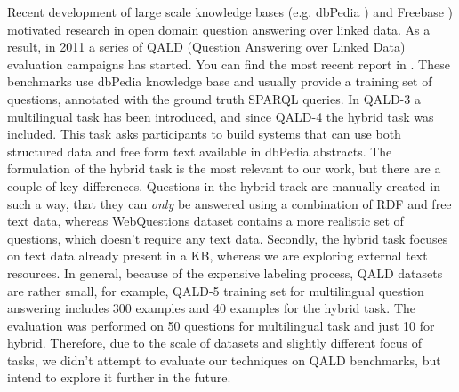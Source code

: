 
Recent development of large scale knowledge bases (e.g. dbPedia \cite{auer2007dbpedia}) and Freebase \cite{Bollacker:2008:FCC:1376616.1376746}) motivated research in open domain question answering over linked data.
As a result, in 2011 a series of QALD (Question Answering over Linked Data) evaluation campaigns has started.
You can find the most recent report in \cite{UngerFLNCCW15}.
These benchmarks use dbPedia knowledge base and usually provide a training set of questions, annotated with the ground truth SPARQL queries.
In QALD-3 a multilingual task has been introduced, and since QALD-4 the hybrid task was included.
This task asks participants to build systems that can use both structured data and free form text available in dbPedia abstracts.
The formulation of the hybrid task is the most relevant to our work, but there are a couple of key differences.
Questions in the hybrid track are manually created in such a way, that they can \textit{only} be answered using a combination of RDF and free text data, whereas WebQuestions dataset contains a more realistic set of questions, which doesn't require any text data.
Secondly, the hybrid task focuses on text data already present in a KB, whereas we are exploring external text resources.
In general, because of the expensive labeling process, QALD datasets are rather small, for example, QALD-5 training set for multilingual question answering includes 300 examples and 40 examples for the hybrid task.
The evaluation was performed on 50 questions for multilingual task and just 10 for hybrid.
Therefore, due to the scale of datasets and slightly different focus of tasks, we didn't attempt to evaluate our techniques on QALD benchmarks, but intend to explore it further in the future.

